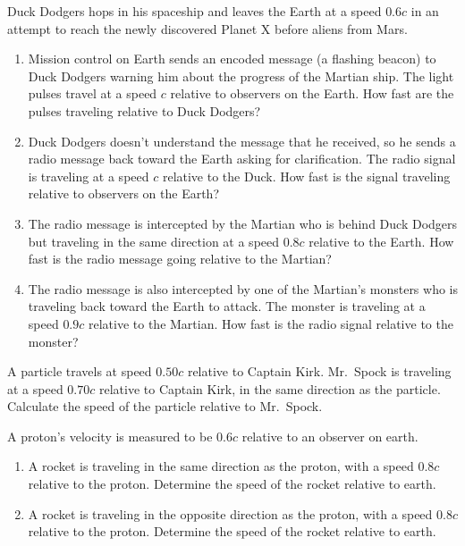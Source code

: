 \begin{exercise}
Duck Dodgers hops in his spaceship and leaves the Earth at a
speed $0.6c$ in an attempt to reach the newly discovered Planet X before
aliens from Mars.
    \begin{enumerate}
    \item Mission control on Earth sends an encoded message (a
    flashing beacon) to Duck Dodgers warning him about the progress of
    the Martian ship.  The light pulses travel at a speed $c$ relative
    to observers on the Earth.  How fast are the pulses traveling
    relative to Duck Dodgers?
    \item Duck Dodgers doesn't understand the message that he
    received, so he sends a radio message back toward the Earth asking
    for clarification.  The radio signal is traveling at a speed $c$
    relative to the Duck.  How fast is the signal traveling relative
    to observers on the Earth?
    \item The radio message is intercepted by the Martian who is
    behind Duck Dodgers but traveling in the same direction at a speed
    $0.8c$ relative to the Earth.  How fast is the radio message going
    relative to the Martian?
    \item The radio message is also intercepted by one of the
    Martian's monsters who is traveling back toward the Earth to
    attack.  The monster is traveling at a speed $0.9c$ relative to the
    Martian.  How fast is the radio signal relative to the monster?
    \end{enumerate}
\end{exercise}

\begin{exercise}
A particle travels at speed $0.50c$ relative to Captain Kirk.
Mr.\ Spock is traveling at a speed $0.70c$ relative to Captain Kirk,
in the same direction as the particle.
Calculate the speed of the particle relative to Mr.\ Spock.
\label{prob:vtransform}
\end{exercise}

\begin{exercise}
A proton's velocity is measured to be $0.6c$ relative to an observer
on earth.  
    \begin{enumerate} 
    \item A rocket is traveling in the same direction as the proton, with 
    a speed $0.8c$ relative to the proton.  Determine the speed of the 
    rocket relative to earth.  
    \item A rocket is traveling in the opposite direction as the proton, 
    with a speed $0.8c$ relative to the proton.  Determine the speed of the 
    rocket relative to earth.
    \end{enumerate}
\label{prob:vtransform2}
\end{exercise}


